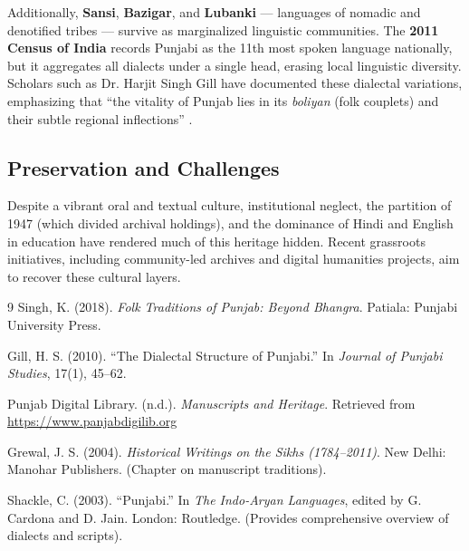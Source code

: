 \documentclass{article}
\begin{document}
Additionally, \textbf{Sansi}, \textbf{Bazigar}, and \textbf{Lubanki} — languages of nomadic and denotified tribes — survive as marginalized linguistic communities. The \textbf{2011 Census of India} records Punjabi as the 11th most spoken language nationally, but it aggregates all dialects under a single head, erasing local linguistic diversity. Scholars such as Dr. Harjit Singh Gill have documented these dialectal variations, emphasizing that “the vitality of Punjab lies in its \textit{boliyan} (folk couplets) and their subtle regional inflections” \cite{gill2010dialect}.

\subsection*{Preservation and Challenges}
Despite a vibrant oral and textual culture, institutional neglect, the partition of 1947 (which divided archival holdings), and the dominance of Hindi and English in education have rendered much of this heritage hidden. Recent grassroots initiatives, including community-led archives and digital humanities projects, aim to recover these cultural layers.

\begin{thebibliography}{9}
Singh, K. (2018). \textit{Folk Traditions of Punjab: Beyond Bhangra}. Patiala: Punjabi University Press.

Gill, H. S. (2010). “The Dialectal Structure of Punjabi.” In \textit{Journal of Punjabi Studies}, 17(1), 45–62.

Punjab Digital Library. (n.d.). \textit{Manuscripts and Heritage}. Retrieved from \url{https://www.panjabdigilib.org}

Grewal, J. S. (2004). \textit{Historical Writings on the Sikhs (1784–2011)}. New Delhi: Manohar Publishers. (Chapter on manuscript traditions).

Shackle, C. (2003). “Punjabi.” In \textit{The Indo-Aryan Languages}, edited by G. Cardona and D. Jain. London: Routledge. (Provides comprehensive overview of dialects and scripts).

\end{thebibliography}
\end{document}
